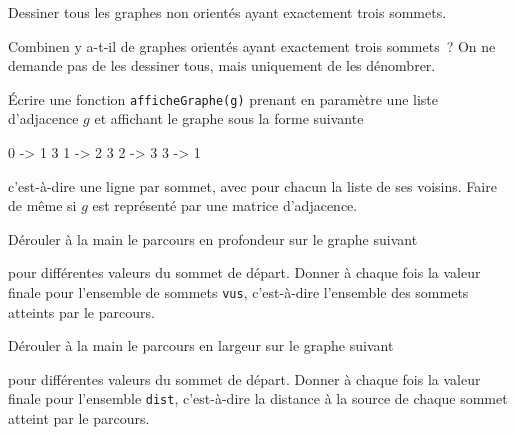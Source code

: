 \documentclass{magnolia}
\begin{document}

Dessiner tous les graphes non orientés ayant exactement trois sommets.

Combinen y a-t-il de graphes orientés ayant exactement trois sommets~? On ne demande pas de
les dessiner tous, mais uniquement de les dénombrer.

\begin{questions}
\question Écrire une fonction \verb!afficheGraphe(g)! prenant en paramètre une liste
  d'adjacence $g$ et affichant le graphe sous la forme suivante
\begin{pythoncode}
0 -> 1 3
1 -> 2 3
2 -> 3
3 -> 1
\end{pythoncode}
  c'est-à-dire une ligne par sommet, avec pour chacun la liste de ses voisins.
\question Faire de même si $g$ est représenté par une matrice d'adjacence.
\end{questions}

Dérouler à la main le parcours en profondeur sur le graphe suivant
\begin{center}
\end{center}
pour différentes valeurs du sommet de départ. Donner à chaque fois la valeur finale pour
l'ensemble de sommets \verb!vus!, c'est-à-dire l'ensemble des sommets atteints par le parcours.

Dérouler à la main le parcours en largeur sur le graphe suivant
\begin{center}
\end{center}
pour différentes valeurs du sommet de départ. Donner à chaque fois la valeur finale pour
l'ensemble \verb!dist!, c'est-à-dire la distance à la source de chaque sommet atteint par
le parcours.


\end{document}
